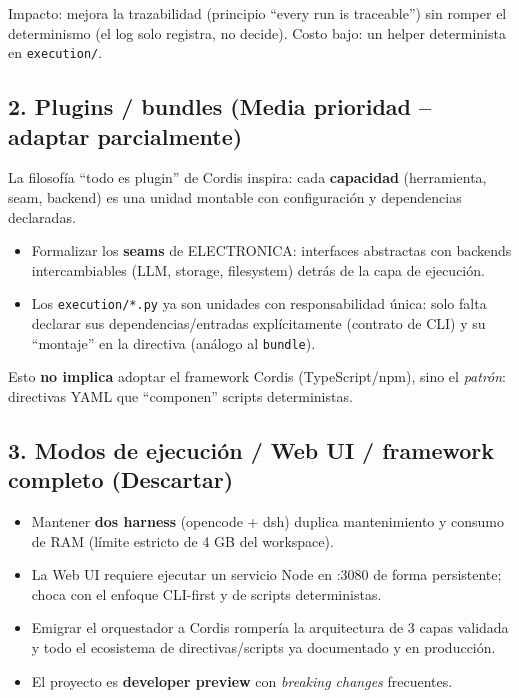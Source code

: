 \documentclass[11pt,a4paper]{article}
\begin{document}
Impacto: mejora la trazabilidad (principio ``every run is traceable'') sin romper el
determinismo (el log solo registra, no decide). Costo bajo: un helper determinista en
\texttt{execution/}.

\subsection{2. Plugins / bundles (Media prioridad -- adaptar parcialmente)}

La filosofía ``todo es plugin'' de Cordis inspira: cada \textbf{capacidad} (herramienta,
seam, backend) es una unidad montable con configuración y dependencias declaradas.

\begin{tcolorbox}[cajaMejora, title={\faIcon{plug}~Qué tomar prestado}]
\begin{itemize}[leftmargin=*,topsep=2pt,itemsep=1pt]
  \item Formalizar los \textbf{seams} de ELECTRONICA: interfaces abstractas con backends
        intercambiables (LLM, storage, filesystem) detrás de la capa de ejecución.
  \item Los \texttt{execution/*.py} ya son unidades con responsabilidad única: solo falta
        declarar sus dependencias/entradas explícitamente (contrato de CLI) y su ``montaje''
        en la directiva (análogo al \texttt{bundle}).
\end{itemize}
\end{tcolorbox}

Esto \textbf{no implica} adoptar el framework Cordis (TypeScript/npm), sino el \textit{patrón}:
directivas YAML que ``componen'' scripts deterministas.

\subsection{3. Modos de ejecución / Web UI / framework completo (Descartar)}

\begin{cajaRecuerda}
\begin{itemize}[leftmargin=*,topsep=2pt,itemsep=1pt]
  \item Mantener \textbf{dos harness} (opencode + dsh) duplica mantenimiento y consumo de RAM
        (límite estricto de 4 GB del workspace).
  \item La Web UI requiere ejecutar un servicio Node en :3080 de forma persistente; choca con
        el enfoque CLI-first y de scripts deterministas.
  \item Emigrar el orquestador a Cordis rompería la arquitectura de 3 capas validada y todo el
        ecosistema de directivas/scripts ya documentado y en producción.
  \item El proyecto es \textbf{developer preview} con \textit{breaking changes} frecuentes.
\end{itemize}
\end{cajaRecuerda}
\end{document}

